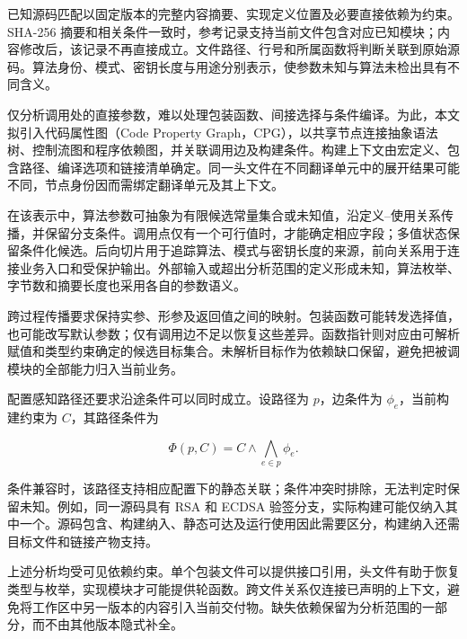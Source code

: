 已知源码匹配以固定版本的完整内容摘要、实现定义位置及必要直接依赖为约束。SHA-256 摘要和相关条件一致时，参考记录支持当前文件包含对应已知模块；内容修改后，该记录不再直接成立。文件路径、行号和所属函数将判断关联到原始源码。算法身份、模式、密钥长度与用途分别表示，使参数未知与算法未检出具有不同含义。

仅分析调用处的直接参数，难以处理包装函数、间接选择与条件编译。为此，本文拟引入代码属性图（Code Property Graph，CPG），以共享节点连接抽象语法树、控制流图和程序依赖图\cite{yamaguchi2014cpg}，并关联调用边及构建条件\cite{joern-cpg}。构建上下文由宏定义、包含路径、编译选项和链接清单确定。同一头文件在不同翻译单元中的展开结果可能不同，节点身份因而需绑定翻译单元及其上下文。

在该表示中，算法参数可抽象为有限候选常量集合或未知值，沿定义--使用关系传播，并保留分支条件。调用点仅有一个可行值时，才能确定相应字段；多值状态保留条件化候选。后向切片用于追踪算法、模式与密钥长度的来源，前向关系用于连接业务入口和受保护输出。外部输入或超出分析范围的定义形成未知，算法枚举、字节数和摘要长度也采用各自的参数语义。

跨过程传播要求保持实参、形参及返回值之间的映射。包装函数可能转发选择值，也可能改写默认参数；仅有调用边不足以恢复这些差异。函数指针则对应由可解析赋值和类型约束确定的候选目标集合。未解析目标作为依赖缺口保留，避免把被调模块的全部能力归入当前业务。

配置感知路径还要求沿途条件可以同时成立。设路径为 $p$，边条件为 $\phi_e$，当前构建约束为 $C$，其路径条件为

\begin{equation}
  \Phi(p,C)=C\land\bigwedge_{e\in p}\phi_e.
  \label{eq:configuration-path-condition}
\end{equation}

条件兼容时，该路径支持相应配置下的静态关联；条件冲突时排除，无法判定时保留未知。例如，同一源码具有 RSA 和 ECDSA 验签分支，实际构建可能仅纳入其中一个。源码包含、构建纳入、静态可达及运行使用因此需要区分，构建纳入还需目标文件和链接产物支持。

上述分析均受可见依赖约束。单个包装文件可以提供接口引用，头文件有助于恢复类型与枚举，实现模块才可能提供轮函数。跨文件关系仅连接已声明的上下文，避免将工作区中另一版本的内容引入当前交付物。缺失依赖保留为分析范围的一部分，而不由其他版本隐式补全。


